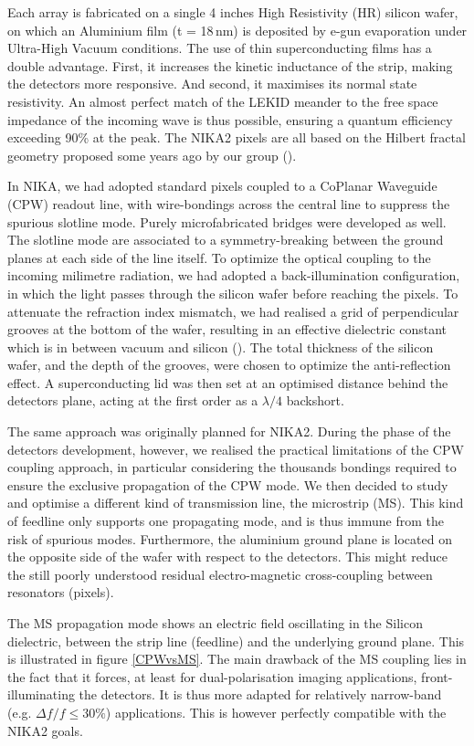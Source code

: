 \documentclass[]{aa} %
\begin{document}
Each array is fabricated on a single 4 inches High Resistivity (HR) silicon wafer, on which an Aluminium film (t = 18\,nm) is deposited by e-gun evaporation under Ultra-High Vacuum conditions. The use of thin superconducting films has a double advantage. First, it increases the kinetic inductance of the strip, making the detectors more responsive. And second, it maximises its normal state resistivity. An almost perfect match of the LEKID meander to the free space impedance of the incoming wave is thus possible, ensuring a quantum efficiency exceeding 90\% at the peak. The NIKA2 pixels are all based on the Hilbert fractal geometry proposed some years ago by our group (\cite{Roesch2012}). 

In NIKA, we had adopted standard pixels coupled to a CoPlanar Waveguide (CPW) readout line, with wire-bondings across the central line to suppress the spurious slotline mode. Purely microfabricated bridges were developed as well. The slotline mode are associated to a symmetry-breaking between the ground planes at each side of the line itself. To optimize the optical coupling to the incoming milimetre radiation, we had adopted a back-illumination configuration, in which the light passes through the silicon wafer before reaching the pixels. To attenuate the refraction index mismatch, we had realised a grid of perpendicular grooves at the bottom of the wafer, resulting in an effective dielectric constant which is in between vacuum and silicon (\cite{Goupy2016}). The total thickness of the silicon wafer, and the depth of the grooves, were chosen to optimize the anti-reflection effect. A superconducting lid was then set at an optimised distance behind the detectors plane, acting at the first order as a $\lambda/4$ backshort. 

The same approach was originally planned for NIKA2. During the phase of the detectors development, however, we realised the practical limitations of the CPW coupling approach, in particular considering the thousands bondings required to ensure the exclusive propagation of the CPW mode. We then decided to study and optimise a different kind of transmission line, the microstrip (MS). This kind of feedline only supports one propagating mode, and is thus immune from the risk of spurious modes. Furthermore, the aluminium ground plane is located on the opposite side of the wafer with respect to the detectors. This might reduce the still poorly understood residual electro-magnetic cross-coupling between resonators (pixels).

The MS propagation mode shows an electric field oscillating in the Silicon dielectric, between the strip line (feedline) and the underlying ground plane. This is illustrated in figure \ref{CPWvsMS}. The main drawback of the MS coupling lies in the fact that it forces, at least for dual-polarisation imaging applications, front-illuminating the detectors. It is thus more adapted for relatively narrow-band (e.g. $\Delta f / f  \leq 30 \%$) applications. This is however perfectly compatible with the NIKA2 goals.  
\end{document}

